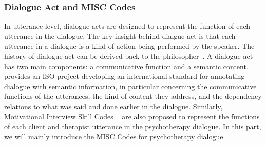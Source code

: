 \subsubsection{Dialogue Act and MISC Codes}
\label{sssec:bg:dialogue-act}
In utterance-level, dialogue acts are designed to represent the
function of each utterance in the dialogue. The key insight behind
dialgue act is that each utterance in a dialogue is a kind of action
being performed by the speaker. The history of dialogue act can be
derived back to the philosopher~\citet{wittgenstein2010philosophical}.
A dialogue act has two main components: a communicative function and a
semantic content. \citet{bunt2010towards} provides an ISO project
developing an international standard for annotating dialogue with
semantic information, in particular concerning the communicative
functions of the utterances, the kind of content they address, and the
dependency relations to what was said and done earlier in the
dialogue. Similarly, Motivational Interview Skill Codes
~\cite[MISC,][]{miller2003motivational,miller2012motivational} are
also proposed to represent the functions of each client and therapist
utterance in the psychotherapy dialogue. In this part, we will mainly
introduce the MISC Codes for psychotherapy dialogue.

